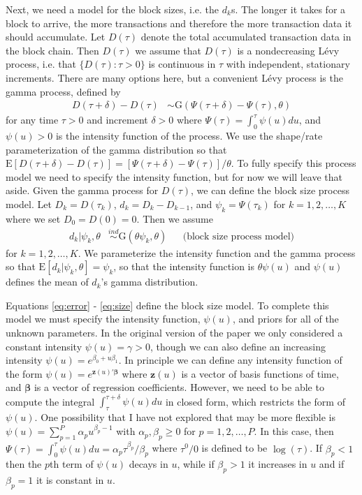 \documentclass[12pt]{article}
\begin{document}
Next, we need a model for the block sizes, i.e. the $d_k$s. The longer it takes for a block to arrive, the more transactions and therefore the more transaction data it should accumulate. Let $D(\tau)$ denote the total accumulated transaction data in the block chain. Then $D(\tau)$ we assume that $D(\tau)$ is a nondecreasing L\'{e}vy process, i.e. that $\{D(\tau): \tau > 0\}$ is continuous in $\tau$ with independent, stationary increments. There are many options here, but a convenient L\'{e}vy process is the gamma process, defined by
\begin{align*}
D(\tau + \delta) - D(\tau) &\sim \mathrm{G}(\Psi(\tau + \delta) - \Psi(\tau), \theta)
\end{align*}
for any time $\tau>0$ and increment $\delta > 0$ where $\Psi(\tau) = \int_0^\tau\psi(u)du$, and $\psi(u)>0$ is the intensity function of the  process. We use the shape/rate parameterization of the gamma distribution so that $\mathrm{E}[D(\tau + \delta) - D(\tau)] = [\Psi(\tau + \delta) - \Psi(\tau)]/\theta$. To fully specify this process model we need to specify the intensity function, but for now we will leave that aside. Given the gamma process for $D(\tau)$, we can define the block size process model. Let $D_k = D(\tau_k)$, $d_k = D_k - D_{k-1}$, and $\psi_k = \Psi(\tau_k)$ for $k=1,2,\dots,K$ where we set $D_0 = D(0) = 0$. Then we assume
\begin{align}
d_k | \psi_k, \theta &\stackrel{ind}{\sim}\mathrm{G}(\theta\psi_k, \theta) && \mbox{(block size process model)}\label{eq:size}
\end{align}
for $k=1,2,\dots,K$. We parameterize the intensity function and the gamma process so that $\mathrm{E}[d_k|\psi_k,\theta] = \psi_k$, so that the intensity function is $\theta\psi(u)$ and $\psi(u)$ defines the mean of $d_k$'s gamma distribution.

Equations \eqref{eq:error} - \eqref{eq:size} define the block size model. To complete this model we must specify the intensity function, $\psi(u)$, and priors for all of the unknown parameters. In the original version of the paper we only considered a constant intensity $\psi(u) = \gamma > 0$, though we can also define an increasing intensity $\psi(u) = e^{\beta_0 + u\beta_1}$. In principle we can define any intensity function of the form $\psi(u) = e^{\bm{z}(u)'\bm{\beta}}$ where $\bm{z}(u)$ is a vector of basis functions of time, and $\bm{\beta}$ is a vector of regression coefficients. However, we need to be able to compute the integral $\int_{\tau}^{\tau + \delta}\psi(u)du$ in closed form, which restricts the form of $\psi(u)$. One possibility that I have not explored that may be more flexible is $\psi(u) = \sum_{p=1}^P\alpha_pu^{\beta_p - 1}$ with $\alpha_p, \beta_p\geq 0$ for $p=1,2,\dots,P$. In this case, then $\Psi(\tau) = \int_0^\tau\psi(u)du = \alpha_p\tau^{\beta_p}/\beta_p$ where $\tau^0/0$ is defined to be $\log(\tau)$. If $\beta_p < 1$ then the $p$th term of $\psi(u)$ decays in $u$, while if $\beta_p > 1$ it increases in $u$ and if $\beta_p = 1$ it is constant in $u$.
\end{document}
